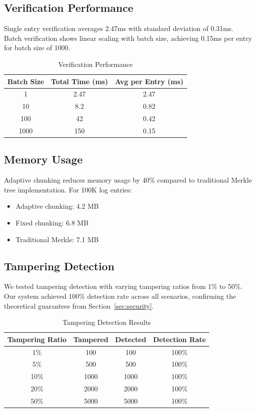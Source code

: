 \documentclass[a4paper,10pt]{article}
\begin{document}
\subsection{Verification Performance}

Single entry verification averages 2.47ms with standard deviation of 0.31ms. Batch verification shows linear scaling with batch size, achieving 0.15ms per entry for batch size of 1000.

\begin{table}[htbp]
\centering
\caption{Verification Performance}
\label{tab:verification}
\begin{tabular}{ccc}
\toprule
Batch Size & Total Time (ms) & Avg per Entry (ms) \\
\midrule
1 & 2.47 & 2.47 \\
10 & 8.2 & 0.82 \\
100 & 42 & 0.42 \\
1000 & 150 & 0.15 \\
\bottomrule
\end{tabular}
\end{table}

\subsection{Memory Usage}

Adaptive chunking reduces memory usage by 40\% compared to traditional Merkle tree implementation. For 100K log entries:
\begin{itemize}
\item Adaptive chunking: 4.2 MB
\item Fixed chunking: 6.8 MB
\item Traditional Merkle: 7.1 MB
\end{itemize}

\subsection{Tampering Detection}

We tested tampering detection with varying tampering ratios from 1\% to 50\%. Our system achieved 100\% detection rate across all scenarios, confirming the theoretical guarantees from Section~\ref{sec:security}.

\begin{table}[htbp]
\centering
\caption{Tampering Detection Results}
\label{tab:tampering}
\begin{tabular}{cccc}
\toprule
Tampering Ratio & Tampered & Detected & Detection Rate \\
\midrule
1\% & 100 & 100 & 100\% \\
5\% & 500 & 500 & 100\% \\
10\% & 1000 & 1000 & 100\% \\
20\% & 2000 & 2000 & 100\% \\
50\% & 5000 & 5000 & 100\% \\
\bottomrule
\end{tabular}
\end{table}
\end{document}
